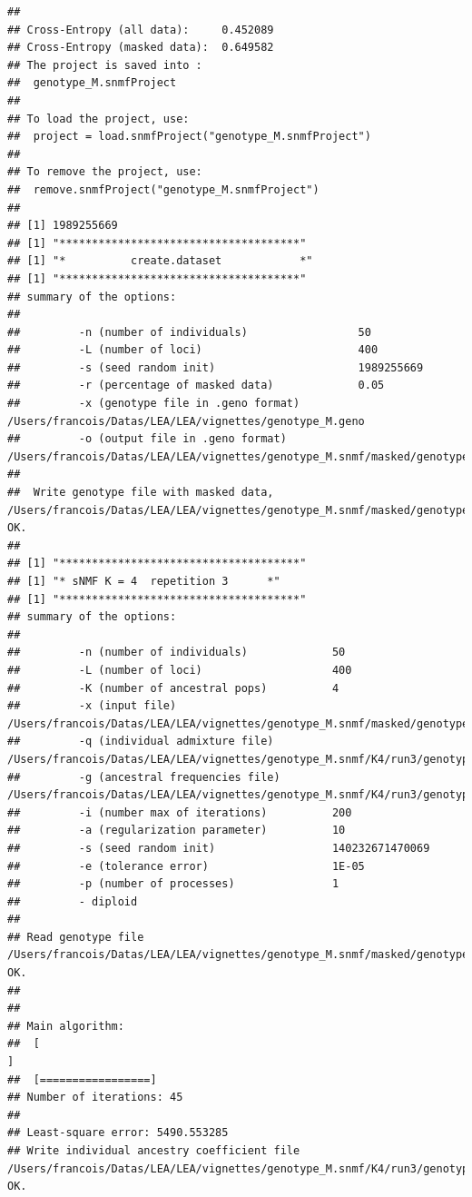 \documentclass[12pt,a4paper,oneside]{article}\usepackage[]{graphicx}\usepackage[]{color}
\makeatletter
\newenvironment{kframe}{%
 \def\at@end@of@kframe{}%
 \ifinner\ifhmode%
  \def\at@end@of@kframe{\end{minipage}}%
  \begin{minipage}{\columnwidth}%
 \fi\fi%
 \def\FrameCommand##1{\hskip\@totalleftmargin \hskip-\fboxsep
 \colorbox{shadecolor}{##1}\hskip-\fboxsep
     \hskip-\linewidth \hskip-\@totalleftmargin \hskip\columnwidth}%
 \MakeFramed {\advance\hsize-\width
   \@totalleftmargin\z@ \linewidth\hsize
   \@setminipage}}%
 {\par\unskip\endMakeFramed%
 \at@end@of@kframe}
\newenvironment{knitrout}{}{} %
\makeatother
\begin{document}
\begin{knitrout}
\begin{kframe}
\begin{verbatim}
## 
## Cross-Entropy (all data):	 0.452089
## Cross-Entropy (masked data):	 0.649582
## The project is saved into :
##  genotype_M.snmfProject 
## 
## To load the project, use:
##  project = load.snmfProject("genotype_M.snmfProject")
## 
## To remove the project, use:
##  remove.snmfProject("genotype_M.snmfProject")
## 
## [1] 1989255669
## [1] "*************************************"
## [1] "*          create.dataset            *"
## [1] "*************************************"
## summary of the options:
## 
##         -n (number of individuals)                 50
##         -L (number of loci)                        400
##         -s (seed random init)                      1989255669
##         -r (percentage of masked data)             0.05
##         -x (genotype file in .geno format)         /Users/francois/Datas/LEA/LEA/vignettes/genotype_M.geno
##         -o (output file in .geno format)           /Users/francois/Datas/LEA/LEA/vignettes/genotype_M.snmf/masked/genotype_M_I.geno
## 
##  Write genotype file with masked data, /Users/francois/Datas/LEA/LEA/vignettes/genotype_M.snmf/masked/genotype_M_I.geno:		OK.
## 
## [1] "*************************************"
## [1] "* sNMF K = 4  repetition 3      *"
## [1] "*************************************"
## summary of the options:
## 
##         -n (number of individuals)             50
##         -L (number of loci)                    400
##         -K (number of ancestral pops)          4
##         -x (input file)                        /Users/francois/Datas/LEA/LEA/vignettes/genotype_M.snmf/masked/genotype_M_I.geno
##         -q (individual admixture file)         /Users/francois/Datas/LEA/LEA/vignettes/genotype_M.snmf/K4/run3/genotype_M_r3.4.Q
##         -g (ancestral frequencies file)        /Users/francois/Datas/LEA/LEA/vignettes/genotype_M.snmf/K4/run3/genotype_M_r3.4.G
##         -i (number max of iterations)          200
##         -a (regularization parameter)          10
##         -s (seed random init)                  140232671470069
##         -e (tolerance error)                   1E-05
##         -p (number of processes)               1
##         - diploid
## 
## Read genotype file /Users/francois/Datas/LEA/LEA/vignettes/genotype_M.snmf/masked/genotype_M_I.geno:		OK.
## 
## 
## Main algorithm:
## 	[                                                                           ]
## 	[=================]
## Number of iterations: 45
## 
## Least-square error: 5490.553285
## Write individual ancestry coefficient file /Users/francois/Datas/LEA/LEA/vignettes/genotype_M.snmf/K4/run3/genotype_M_r3.4.Q:		OK.

\end{verbatim}
\end{kframe}
\end{knitrout}
\end{document}
